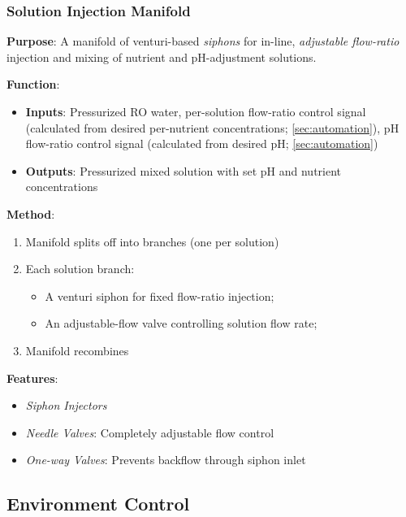 \documentclass{report}
\begin{document}
\newpage

\subsubsection{Solution Injection Manifold}
\label{sec:manifold}

\textbf{Purpose}: A manifold of venturi-based \textit{siphons} for in-line, \textit{adjustable flow-ratio} injection and mixing of nutrient and pH-adjustment solutions.

\textbf{Function}:
\begin{itemize}
    \item \textbf{Inputs}: Pressurized RO water, per-solution flow-ratio control signal (calculated from desired per-nutrient concentrations; \ref{sec:automation}), pH flow-ratio control signal (calculated from desired pH; \ref{sec:automation})
    \item \textbf{Outputs}: Pressurized mixed solution with set pH and nutrient concentrations
\end{itemize}

\textbf{Method}:
\begin{enumerate}
    \item Manifold splits off into branches (one per solution)
    \item Each solution branch:
    \begin{itemize}
        \item A venturi siphon for fixed flow-ratio injection;
        \item An adjustable-flow valve controlling solution flow rate;
    \end{itemize}
    \item Manifold recombines
\end{enumerate}

\textbf{Features}:
\begin{itemize}
    \item \textit{Siphon Injectors}
    \item \textit{Needle Valves}: Completely adjustable flow control
    \item \textit{One-way Valves}: Prevents backflow through siphon inlet
\end{itemize}


\subsection{Environment Control}
\label{sec:environment}
\end{document}
